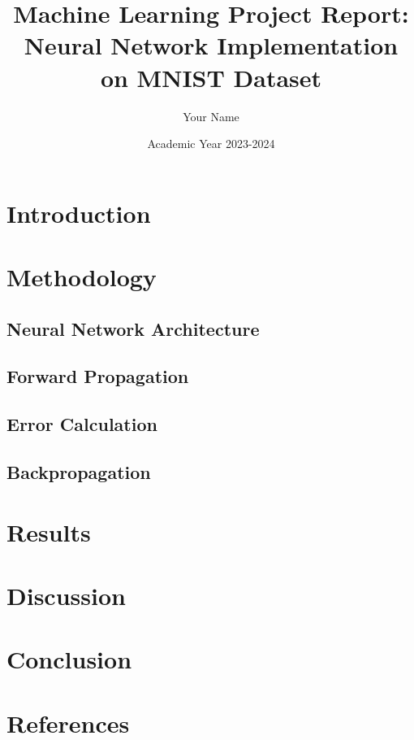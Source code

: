 \documentclass{article}
\title{Machine Learning Project Report: Neural Network Implementation on MNIST Dataset}
\author{Your Name}
\date{Academic Year 2023-2024}
\begin{document}
\maketitle

\begin{abstract}
\end{abstract}

\section{Introduction}

\section{Methodology}

\subsection{Neural Network Architecture}

\subsection{Forward Propagation}

\subsection{Error Calculation}

\subsection{Backpropagation}

\section{Results}

\section{Discussion}

\section{Conclusion}

\section{References}

\end{document}
